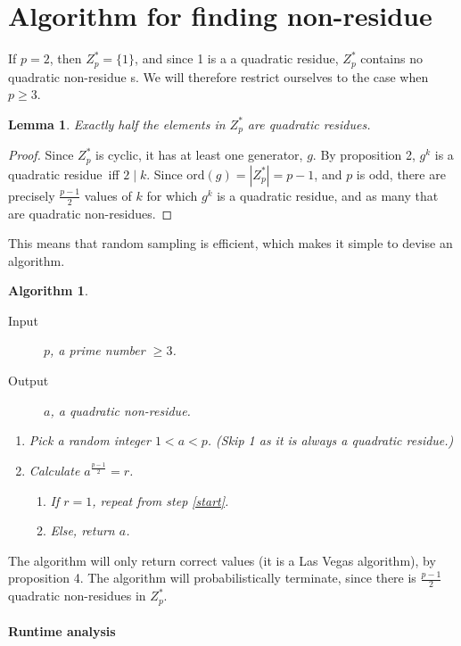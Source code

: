 \documentclass{article}
\title{\Qr}
\author{Rikard Hjort\\\texttt{hjortr@student.chalmers.se}}
\date{\today}
\newcommand{\z}{Z^*_p}
\newcommand{\ord}{\text{ord}}
\newcommand{\qr}{{quadratic residue}}
\newcommand{\qnr}{{quadratic non-residue}}
\newtheorem{algorithm}[theorem]{Algorithm}
\newtheorem{lemma}[theorem]{Lemma}
\begin{document}
\maketitle
\section{Algorithm for finding non-residue}

If $p = 2$, then $\z = \{1\}$, and since 1 is a a \qr, $\z$ contains no \qnr
s. We will therefore restrict ourselves to the case when $p \geq 3$.

\begin{lemma}\label{half}
  Exactly half the elements in $\z$ are \qr s.
\end{lemma}
\begin{proof}
  Since $\z$ is cyclic, it has at least one generator, $g$. By proposition 2,
  $g^k$ is a \qr~iff $2 \mid k$. Since $\ord(g) = |\z|= p-1$, and $p$ is odd,
  there are precisely $\frac{p-1}{2}$ values of $k$ for which $g^k$ is a \qr,
  and as many that are \qnr s.
\end{proof}

This means that random sampling is efficient, which makes it simple to devise an algorithm.
\begin{algorithm}
  \hfill\break
  \begin{description}
  \item[Input] $p$, a prime number $\geq 3$.
  \item[Output] $a$, a \qnr.
  \end{description}
  \begin{enumerate}
  \item\label{start} Pick a random integer $1 < a < p$. (Skip 1 as it is always
    a \qr.)
  \item Calculate $a^{\frac{p-1}{2}} = r$.
    \begin{enumerate}
    \item If $r = 1$, repeat from step \ref{start}.
    \item Else, return $a$.
    \end{enumerate}
  \end{enumerate}
\end{algorithm}

The algorithm will only return correct values (it is a Las Vegas algorithm),
by proposition 4. The algorithm will probabilistically terminate, since
there is $\frac{p-1}{2}$ \qnr s in $\z$.

\paragraph{Runtime analysis}
\end{document}
